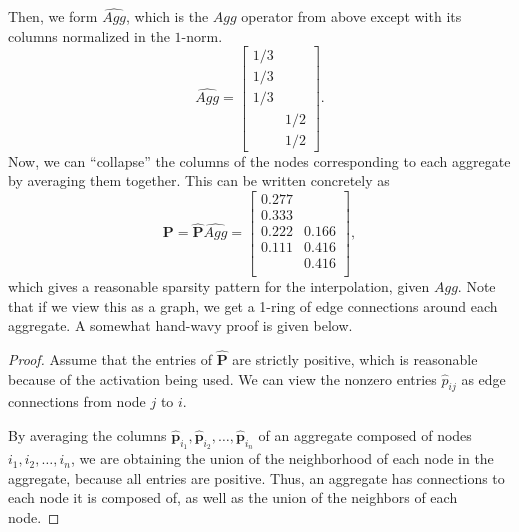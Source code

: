 \documentclass{article}
\newcommand{\mat}[1]{\bm{{#1}}}
\renewcommand{\vec}[1]{\bm{{#1}}}
\newcommand{\sfrac}[2]{#1/#2}
\begin{document}
Then, we form $\hat{Agg}$, which is the $Agg$ operator from above except with its columns normalized in the $1$-norm.
\begin{equation}
\hat{Agg} =
\begin{bmatrix}
  \sfrac{1}{3} & \\
  \sfrac{1}{3} & \\
  \sfrac{1}{3} & \\
  & \sfrac{1}{2} \\
  & \sfrac{1}{2}
\end{bmatrix}.
\end{equation}
Now, we can ``collapse'' the columns of the nodes corresponding to each aggregate by averaging them together.  This can be written concretely as
\begin{equation}
\mat{P} = \mat{\hat{P}}\hat{Agg} = \begin{bmatrix}
  0.277 & \\
  0.333 & \\
  0.222 & 0.166 \\
  0.111 & 0.416 \\
  & 0.416 \\
\end{bmatrix},
\end{equation}
which gives a reasonable sparsity pattern for the interpolation, given $Agg$.  Note that if we view this as a graph, we get a 1-ring of edge connections around each aggregate.  A somewhat hand-wavy proof is given below.
\begin{proof}
  Assume that the entries of $\mat{\hat{P}}$ are strictly positive, which is reasonable because of the activation being used.  We can view the nonzero entries $\hat{p}_{ij}$ as edge connections from node $j$ to $i$.

  By averaging the columns $\vec{\hat{p}}_{i_1}, \vec{\hat{p}}_{i_2}, \ldots, \vec{\hat{p}}_{i_n}$ of an aggregate composed of nodes $i_1, i_2, \ldots, i_n$, we are obtaining the union of the neighborhood of each node in the aggregate, because all entries are positive.  Thus, an aggregate has connections to each node it is composed of, as well as the union of the neighbors of each node.
\end{proof}
\end{document}
